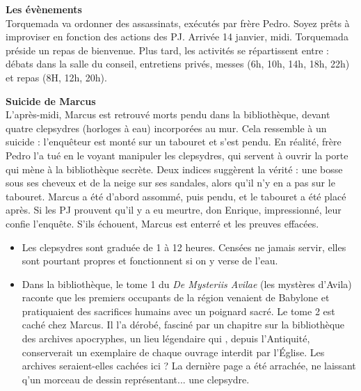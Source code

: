 \documentclass[11pt,twoside,a4paper]{book}
\begin{document}
\textbf{\large Les {\'e}v{\`e}nements}~\\

Torquemada va ordonner des assassinats, ex{\'e}cut{\'e}s par fr{\`e}re Pedro. Soyez pr{\^e}ts {\`a} improviser en fonction des actions des PJ. Arriv{\'e}e 14 janvier, midi. Torquemada pr{\'e}side un repas de bienvenue. Plus tard, les activit{\'e}s se r{\'e}partissent entre : d{\'e}bats dans la salle du conseil, entretiens priv{\'e}s, messes (6h, 10h, 14h, 18h, 22h) et repas (8H, 12h, 20h).~\\

\clearpage

\textbf{Suicide de Marcus}~\\

L'apr{\`e}s-midi, Marcus est retrouv{\'e} morts pendu dans la biblioth{\`e}que, devant quatre clepsydres (horloges {\`a} eau) incorpor{\'e}es au mur. Cela ressemble {\`a} un suicide : l'enqu{\^e}teur est mont{\'e} sur un tabouret et s'est pendu. En r{\'e}alit{\'e}, fr{\`e}re Pedro l'a tu{\'e} en le voyant manipuler les clepsydres, qui servent {\`a} ouvrir la porte qui m{\`e}ne {\`a} la biblioth{\`e}que secr{\`e}te. Deux indices sugg{\`e}rent la v{\'e}rit{\'e} : une bosse sous ses cheveux et de la neige sur ses sandales, alors qu'il n'y en a pas sur le tabouret. Marcus a {\'e}t{\'e} d'abord assomm{\'e}, puis pendu, et le tabouret a {\'e}t{\'e} plac{\'e} apr{\`e}s. Si les PJ prouvent qu'il y a eu meurtre, don Enrique, impressionn{\'e}, leur confie l'enqu{\^e}te. S'ils {\'e}chouent, Marcus est enterr{\'e} et les preuves effac{\'e}es.~\\
\setlength\parindent{20pt}
\begin{itemize}
	\item Les clepsydres sont gradu{\'e}e de 1 {\`a} 12 heures. Cens{\'e}es ne jamais servir, elles sont pourtant propres et fonctionnent si on y verse de l'eau.
	\item Dans la biblioth{\`e}que, le tome 1 du \emph{De Mysteriis Avilae} (les myst{\`e}res d'Avila) raconte que les premiers occupants de la r{\'e}gion venaient de Babylone et pratiquaient des sacrifices humains avec un poignard sacr{\'e}. Le tome 2 est cach{\'e} chez Marcus. Il l'a d{\'e}rob{\'e}, fascin{\'e} par un chapitre sur la biblioth{\`e}que des archives apocryphes, un lieu l{\'e}gendaire qui , depuis l'Antiquit{\'e}, conserverait un exemplaire de chaque ouvrage interdit par l'{\'E}glise. Les archives seraient-elles cach{\'e}es ici ? La derni{\`e}re page a {\'e}t{\'e} arrach{\'e}e, ne laissant q'un morceau de dessin repr{\'e}sentant... une clepsydre. 
\end{itemize}~\\
\setlength\parindent{0pt}
\end{document}
